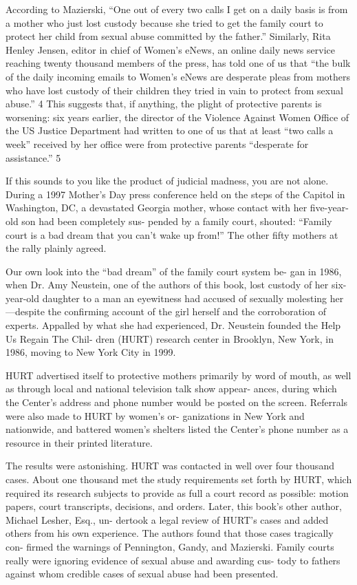According to Mazierski, “One out of every two calls I get on a daily
basis is from a mother who just lost custody because she tried to get the
family court to protect her child from sexual abuse committed by the
father.” Similarly, Rita Henley Jensen, editor in chief of Women’s eNews,
an online daily news service reaching twenty thousand members of the
press, has told one of us that “the bulk of the daily incoming emails to
Women’s eNews are desperate pleas from mothers who have lost custody
of their children they tried in vain to protect from sexual abuse.” 4 This
suggests that, if anything, the plight of protective parents is worsening:
six years earlier, the director of the Violence Against Women Office of
the US Justice Department had written to one of us that at least “two calls
a week” received by her office were from protective parents “desperate
for assistance.” 5 \pfl{}


If this sounds to you like the product of judicial madness, you are
not alone. During a 1997 Mother’s Day press conference held on the
steps of the Capitol in Washington, DC, a devastated Georgia mother,
whose contact with her five-year-old son had been completely sus-
pended by a family court, shouted: “Family court is a bad dream that
you can’t wake up from!” The other fifty mothers at the rally plainly
agreed. \pfl{}



Our own look into the “bad dream” of the family court system be-
gan in 1986, when Dr. Amy Neustein, one of the authors of this book,
lost custody of her six-year-old daughter to a man an eyewitness had
accused of sexually molesting her—despite the confirming account of
the girl herself and the corroboration of experts. Appalled by what she
had experienced, Dr. Neustein founded the Help Us Regain The Chil-
dren (HURT) research center in Brooklyn, New York, in 1986, moving
to New York City in 1999. \pfl{}


HURT advertised itself to protective mothers primarily by word of
mouth, as well as through local and national television talk show appear-
ances, during which the Center’s address and phone number would be
posted on the screen. Referrals were also made to HURT by women’s or-
ganizations in New York and nationwide, and battered women’s shelters
listed the Center’s phone number as a resource in their printed literature. \pfl{}


The results were astonishing. HURT was contacted in well over four
thousand cases. About one thousand met the study requirements set
forth by HURT, which required its research subjects to provide as full
a court record as possible: motion papers, court transcripts, decisions,
and orders. Later, this book’s other author, Michael Lesher, Esq., un-
dertook a legal review of HURT’s cases and added others from his
own experience. The authors found that those cases tragically con-
firmed the warnings of Pennington, Gandy, and Mazierski. Family
courts really were ignoring evidence of sexual abuse and awarding cus-
tody to fathers against whom credible cases of sexual abuse had been
presented. \pfl{}


